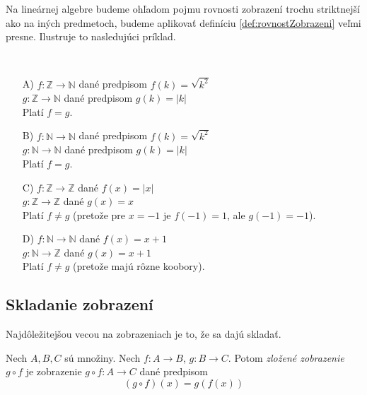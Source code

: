 Na lineárnej algebre budeme ohľadom pojmu rovnosti zobrazení trochu striktnejší ako
na iných predmetoch, budeme aplikovať definíciu \ref{def:rovnostZobrazeni} veľmi
presne.
Ilustruje to nasledujúci príklad.

\begin{example}~\par
\begin{enumerate}
    \item[A)] $f \colon \mathbb{Z} \rightarrow \mathbb{N}$ dané predpisom $f(k) = \sqrt{k^2}$ \\
    $g \colon \mathbb{Z} \rightarrow \mathbb{N}$ dané predpisom $g(k) = |k|$ \\
    Platí $f=g$.
    \item[B)] $f \colon \mathbb{N} \rightarrow \mathbb{N}$ dané predpisom $f(k) = \sqrt{k^2}$ \\
    $g \colon \mathbb{N} \rightarrow \mathbb{N}$ dané predpisom $g(k) = |k|$ \\
    Platí $f=g$.
    \item[C)] $f \colon \mathbb{Z} \rightarrow \mathbb{Z}$ dané $f(x) = |x|$ \\
    $g \colon \mathbb{Z} \rightarrow \mathbb{Z}$ dané $g(x) = x$ \\
    Platí $f \neq g$ (pretože pre $x=-1$ je $f(-1)=1$, ale $g(-1)=-1$).
    \item[D)] $f \colon \mathbb{N} \rightarrow \mathbb{N}$ dané $f(x) = x+1$ \\
    $g \colon \mathbb{N} \rightarrow \mathbb{Z}$ dané $g(x) = x+1$ \\
    Platí $f \neq g$ (pretože majú rôzne koobory).
\end{enumerate}
\end{example}

\subsection{Skladanie zobrazení}

Najdôležitejšou vecou na zobrazeniach je to, že sa dajú skladať.

\begin{definition}
Nech $A, B, C$ sú množiny. Nech $f \colon A \rightarrow B$, $g \colon B \rightarrow C$.
Potom \emph{zložené zobrazenie} $g \circ f$ je zobrazenie $g \circ f \colon A \rightarrow C$ dané predpisom
\begin{equation}\label{eq:zlozeneZobrazenie}
(g \circ f)(x) = g(f(x))
\end{equation}
\end{definition}

